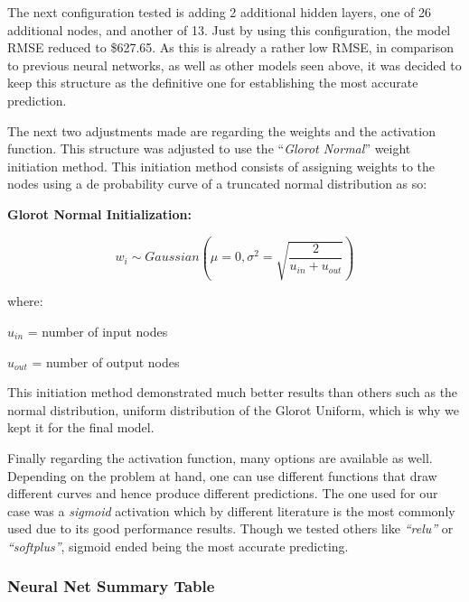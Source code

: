 \documentclass[
  paper=a4,
  ,captions=tableheading
]{scrartcl}
\begin{document}
The next configuration tested is adding 2 additional hidden layers, one
of 26 additional nodes, and another of 13. Just by using this
configuration, the model RMSE reduced to \$627.65. As this is already a
rather low RMSE, in comparison to previous neural networks, as well as
other models seen above, it was decided to keep this structure as the
definitive one for establishing the most accurate prediction.

The next two adjustments made are regarding the weights and the
activation function. This structure was adjusted to use the
``\emph{Glorot Normal}'' weight initiation method. This initiation
method consists of assigning weights to the nodes using a de probability
curve of a truncated normal distribution as so:

\textbf{Glorot Normal Initialization:}

\[w_{i} \sim Gaussian \left(\mu = 0, \sigma^{2} = \sqrt{\frac{2} {u_{in} + u_{out} }}\right)\]

where:

\(u_{in}\) = number of input nodes

\(u_{out}\) = number of output nodes

This initiation method demonstrated much better results than others such
as the normal distribution, uniform distribution of the Glorot Uniform,
which is why we kept it for the final model.

Finally regarding the activation function, many options are available as
well. Depending on the problem at hand, one can use different functions
that draw different curves and hence produce different predictions. The
one used for our case was a \emph{sigmoid} activation which by different
literature is the most commonly used due to its good performance
results. Though we tested others like \emph{``relu''} or
\emph{``softplus''}, sigmoid ended being the most accurate predicting.

\hypertarget{neural-net-summary-table}{%
\subsubsection{Neural Net Summary
Table}\label{neural-net-summary-table}}
\end{document}
